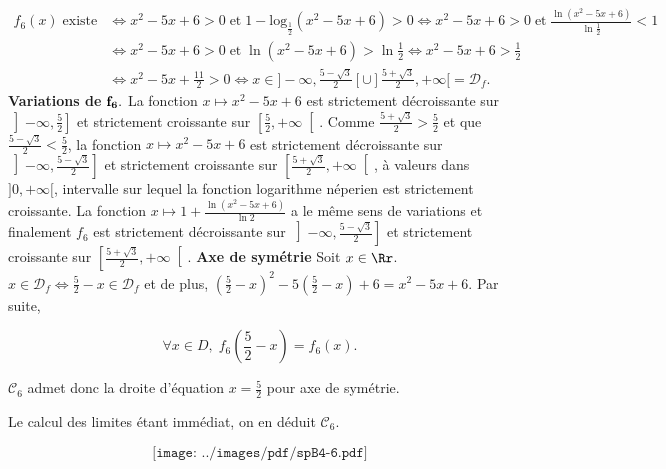 {\begin{enumerate}
{\begin{align*}
f_6(x)\;\mbox{existe}&\Leftrightarrow x^2-5x+6>0\;\mbox{et}\;1-\mbox{log}_{\frac{1}{2}}(x^2-5x+6)>0
\Leftrightarrow x^2-5x+6>0\;\mbox{et}\;\frac{\ln(x^2-5x+6)}{\ln\frac{1}{2}}<1\\
 &\Leftrightarrow x^2-5x+6>0\;\mbox{et}\;\ln(x^2-5x+6)>\ln\frac{1}{2}\Leftrightarrow x^2-5x+6>\frac{1}{2}\\
 &\Leftrightarrow x^2-5x+\frac{11}{2}>0\Leftrightarrow x\in]-\infty,\frac{5-\sqrt{3}}{2}[\cup]\frac{5+\sqrt{3}}{2},+\infty[=\mathcal{D}_f.
\end{align*}
\textbf{Variations de} $\bf{f_6.}$ La fonction $x\mapsto x^2-5x+6$ est strictement décroissante sur
$\left]-\infty,\frac{5}{2}\right]$ et strictement croissante sur $\left[\frac{5}{2},+\infty\right[$. Comme
$\frac{5+\sqrt{3}}{2}>\frac{5}{2}$ et que $\frac{5-\sqrt{3}}{2}<\frac{5}{2}$, la fonction $x\mapsto x^2-5x+6$ est
strictement décroissante sur$\left]-\infty,\frac{5-\sqrt{3}}{2}\right]$ et strictement croissante sur
$\left[\frac{5+\sqrt{3}}{2},+\infty\right[$, à valeurs dans $]0,+\infty[$, intervalle sur lequel la fonction logarithme néperien
est strictement croissante. La fonction $x\mapsto1+\frac{\ln(x^2-5x+6)}{\ln2}$ a le même sens de variations et
finalement $f_6$ est strictement décroissante sur $\left]-\infty,\frac{5-\sqrt{3}}{2}\right]$ et strictement croissante
sur $\left[\frac{5+\sqrt{3}}{2},+\infty\right[$.
\textbf{Axe de symétrie} Soit $x\in\Rr$. $x\in\mathcal{D}_f\Leftrightarrow\frac{5}{2}-x\in\mathcal{D}_f$ et de 
plus, $\left(\frac{5}{2}-x\right)^2-5\left(\frac{5}{2}-x\right)+6=x^2-5x+6$. Par suite,

$$\forall x\in D,\;f_6(\frac{5}{2}-x)=f_6(x).$$

$\mathcal{C}_6$ admet donc la droite d'équation $x=\frac{5}{2}$ pour axe de symétrie.

Le calcul des limites étant immédiat, on en déduit $\mathcal{C}_6$.

$$\texttt{[image: ../images/pdf/spB4-6.pdf]}$$}
\end{enumerate}
}
